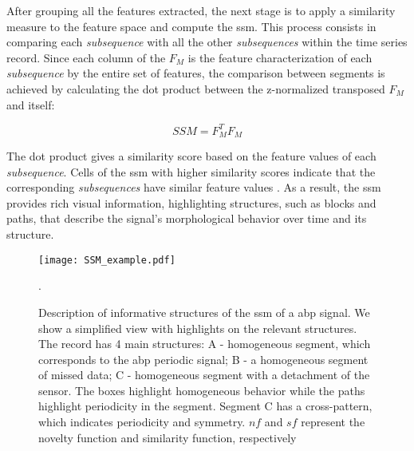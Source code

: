 After grouping all the features extracted, the next stage is to apply a similarity measure to the feature space and compute the \gls{ssm}. This process consists in comparing each \textit{subsequence} with all the other \textit{subsequences} within the time series record. Since each column of the $F_M$ is the feature characterization of each \textit{subsequence} by the entire set of features, the comparison between segments is achieved by calculating the dot product between the z-normalized transposed $F_{M}$ and itself:

\begin{equation}
    SSM = F^T_M F_M
\end{equation}

The dot product gives a similarity score based on the feature values of each \textit{subsequence}. Cells of the \gls{ssm} with higher similarity scores indicate that the corresponding \textit{subsequences} have similar feature values \cite{audiolabs1, audiolabs2}. As a result, the \gls{ssm} provides rich visual information, highlighting structures, such as blocks and paths, that describe the signal's morphological behavior over time and its structure.

\begin{figure}
    \centering
    \texttt{[image: SSM\_example.pdf]}
    \caption{Description of informative structures of the \gls{ssm} of a \gls{abp} signal. We show a simplified view with highlights on the relevant structures. The record has 4 main structures: A - homogeneous segment, which corresponds to the \gls{abp} periodic signal; B - a homogeneous segment of missed data; C - homogeneous segment with a detachment of the sensor. The boxes highlight homogeneous behavior while the paths highlight periodicity in the segment. Segment C has a cross-pattern, which indicates periodicity and symmetry. $nf$ and $sf$ represent the novelty function and similarity function, respectively}. 
    \label{fig:ssm_description}
\end{figure}

